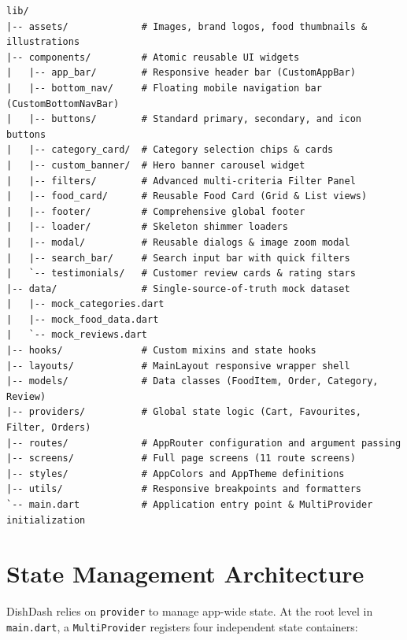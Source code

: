\documentclass[11pt,a4paper]{article}
\begin{document}
\begin{lstlisting}[caption={DishDash Codebase Directory Layout}]
lib/
|-- assets/             # Images, brand logos, food thumbnails & illustrations
|-- components/         # Atomic reusable UI widgets
|   |-- app_bar/        # Responsive header bar (CustomAppBar)
|   |-- bottom_nav/     # Floating mobile navigation bar (CustomBottomNavBar)
|   |-- buttons/        # Standard primary, secondary, and icon buttons
|   |-- category_card/  # Category selection chips & cards
|   |-- custom_banner/  # Hero banner carousel widget
|   |-- filters/        # Advanced multi-criteria Filter Panel
|   |-- food_card/      # Reusable Food Card (Grid & List views)
|   |-- footer/         # Comprehensive global footer
|   |-- loader/         # Skeleton shimmer loaders
|   |-- modal/          # Reusable dialogs & image zoom modal
|   |-- search_bar/     # Search input bar with quick filters
|   `-- testimonials/   # Customer review cards & rating stars
|-- data/               # Single-source-of-truth mock dataset
|   |-- mock_categories.dart
|   |-- mock_food_data.dart
|   `-- mock_reviews.dart
|-- hooks/              # Custom mixins and state hooks
|-- layouts/            # MainLayout responsive wrapper shell
|-- models/             # Data classes (FoodItem, Order, Category, Review)
|-- providers/          # Global state logic (Cart, Favourites, Filter, Orders)
|-- routes/             # AppRouter configuration and argument passing
|-- screens/            # Full page screens (11 route screens)
|-- styles/             # AppColors and AppTheme definitions
|-- utils/              # Responsive breakpoints and formatters
`-- main.dart           # Application entry point & MultiProvider initialization
\end{lstlisting}

\FloatBarrier

\section{State Management Architecture}

DishDash relies on \texttt{provider} to manage app-wide state. At the root level in \texttt{main.dart}, a \texttt{MultiProvider} registers four independent state containers:
\end{document}
